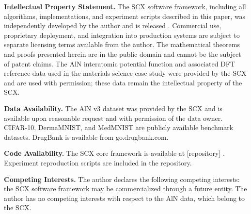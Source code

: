 \documentclass[12pt,a4paper]{article}
\begin{document}
\textbf{Intellectual Property Statement.}
The SCX software framework, including all algorithms, implementations, and experiment scripts described in this paper, was independently developed by the author and is released . Commercial use, proprietary deployment, and integration into production systems are subject to separate licensing terms available from the author. The mathematical theorems and proofs presented herein are in the public domain and cannot be the subject of patent claims. The AlN interatomic potential function and associated DFT reference data used in the materials science case study were provided by the SCX and are used with permission; these data remain the intellectual property of the SCX.

\textbf{Data Availability.}
The AlN v3 dataset was provided by the SCX and is available upon reasonable request and with permission of the data owner. CIFAR-10, DermaMNIST, and MedMNIST are publicly available benchmark datasets. DrugBank is available from go.drugbank.com.

\textbf{Code Availability.}
The SCX core framework is available at [repository] . Experiment reproduction scripts are included in the repository.

\textbf{Competing Interests.}
The author declares the following competing interests: the SCX software framework may be commercialized through a future entity. The author has no competing interests with respect to the AlN data, which belong to the SCX.
\end{document}
